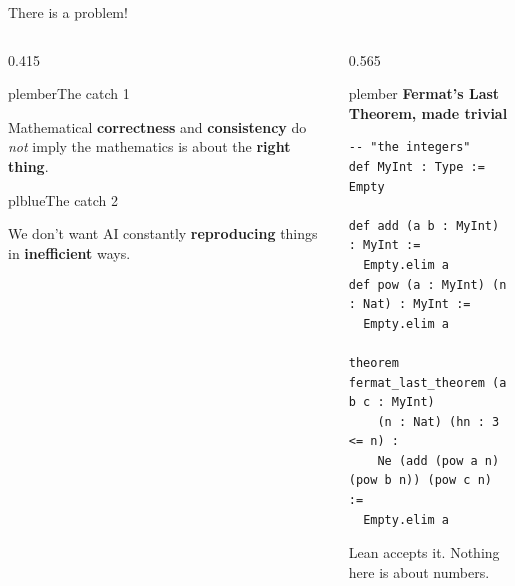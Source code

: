 \documentclass[aspectratio=169,10pt]{beamer}
\newcommand{\plbody}{\small}
\newcommand{\plmeta}{\footnotesize}
\newcommand{\pllabel}{\footnotesize\bfseries}
\begin{document}
\begin{frame}[fragile]{There is a problem!}
  \vfill
  \begin{columns}[c,onlytextwidth]

    \begin{column}{0.415\textwidth}
      \begin{plcard}[top=7pt,bottom=7pt]{plember}{The catch 1}
        {\plbody Mathematical \textbf{correctness} and \textbf{consistency}
         do \emph{not} imply the mathematics is about the
         \textbf{right thing}.\par}
      \end{plcard}

      \begin{plcard}[top=7pt,bottom=7pt,before skip=2pt]{plblue}{The catch 2}
        {\plbody We don't want AI constantly \textbf{reproducing}
         things in \textbf{inefficient} ways.\par}
      \end{plcard}
    \end{column}

    \begin{column}{0.565\textwidth}
      \begin{plplain}[top=3pt,bottom=3pt]{plember}
        {\pllabel\color{plember}Fermat's Last Theorem, made trivial}
        \vspace{3pt}
\begin{lstlisting}
-- "the integers"
def MyInt : Type := Empty

def add (a b : MyInt) : MyInt :=
  Empty.elim a
def pow (a : MyInt) (n : Nat) : MyInt :=
  Empty.elim a

theorem fermat_last_theorem (a b c : MyInt)
    (n : Nat) (hn : 3 <= n) :
    Ne (add (pow a n) (pow b n)) (pow c n) :=
  Empty.elim a
\end{lstlisting}
      \end{plplain}
      \vspace{2pt}
      {\plmeta\color{white!85}\;
        Lean accepts it. Nothing here is about numbers.\par}
    \end{column}

  \end{columns}
  \vfill
\end{frame}
\end{document}
